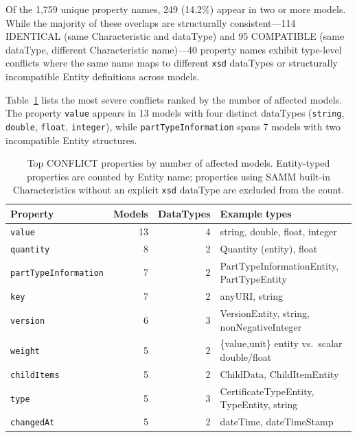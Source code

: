 \documentclass[]{ceurart}
\begin{document}
Of the 1{,}759 unique property names, 249 (14.2\%) appear in two or more
models. While the majority of these overlaps are structurally
consistent---114 IDENTICAL (same Characteristic and dataType) and 95
COMPATIBLE (same dataType, different Characteristic name)---40 property
names exhibit type-level conflicts where the same name maps to different
\texttt{xsd} dataTypes or structurally incompatible Entity definitions
across models.

Table~\ref{tab:top-conflicts} lists the most severe conflicts ranked by
the number of affected models. The property \texttt{value} appears in 13
models with four distinct dataTypes (\texttt{string}, \texttt{double},
\texttt{float}, \texttt{integer}), while \texttt{partTypeInformation}
spans 7 models with two incompatible Entity structures.

\begin{table}[h]
  \caption{Top CONFLICT properties by number of affected models.
    Entity-typed properties are counted by Entity name; properties
    using SAMM built-in Characteristics without an explicit
    \texttt{xsd} dataType are excluded from the count.}
  \label{tab:top-conflicts}
  \begin{tabular}{lrrp{4.5cm}}
    \toprule
    Property & Models & DataTypes & Example types \\
    \midrule
    \texttt{value}       & 13 & 4 & string, double, float, integer \\
    \texttt{quantity}    &  8 & 2 & Quantity (entity), float \\
    \texttt{partTypeInformation} & 7 & 2 & PartTypeInformationEntity, PartTypeEntity \\
    \texttt{key}         &  7 & 2 & anyURI, string \\
    \texttt{version}     &  6 & 3 & VersionEntity, string, nonNegativeInteger \\
    \texttt{weight}      &  5 & 2 & \{value,unit\} entity vs.\ scalar double/float \\
    \texttt{childItems}  &  5 & 2 & ChildData, ChildItemEntity \\
    \texttt{type}        &  5 & 3 & CertificateTypeEntity, TypeEntity, string \\
    \texttt{changedAt}   &  5 & 2 & dateTime, dateTimeStamp \\
    \bottomrule
  \end{tabular}
\end{table}
\end{document}
